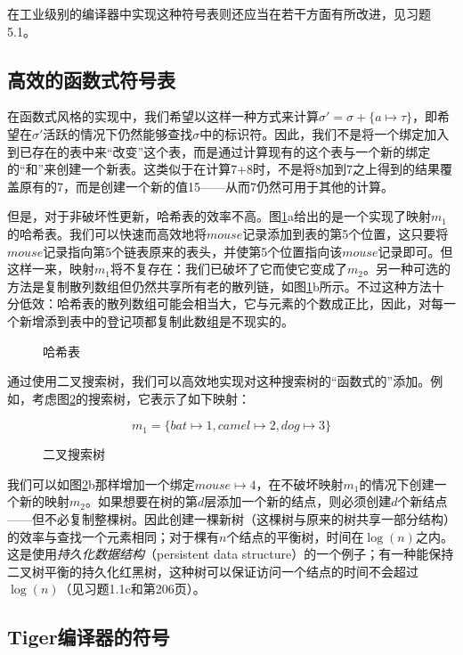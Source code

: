 \documentclass[cn,11pt,chinese]{elegantbook}
\begin{document}
在工业级别的编译器中实现这种符号表则还应当在若干方面有所改进，见习题5.1。

\subsection{高效的函数式符号表}

在函数式风格的实现中，我们希望以这样一种方式来计算$\sigma'=\sigma+\{a\mapsto\tau\}$，即希望在$\sigma'$活跃的情况下仍然能够查找$\sigma$中的标识符。因此，我们不是将一个绑定加入到已存在的表中来“改变”这个表，而是通过计算现有的这个表与一个新的绑定的“和”来创建一个新表。这类似于在计算7+8时，不是将8加到7之上得到的结果覆盖原有的7，而是创建一个新的值15——从而7仍然可用于其他的计算。

但是，对于非破坏性更新，哈希表的效率不高。图\ref{fig:5-3}a给出的是一个实现了映射$m_1$的哈希表。我们可以快速而高效地将$mouse$记录添加到表的第5个位置，这只要将$mouse$记录指向第5个链表原来的表头，并使第5个位置指向该$mouse$记录即可。但这样一来，映射$m_1$将不复存在：我们已破坏了它而使它变成了$m_2$。另一种可选的方法是复制散列数组但仍然共享所有老的散列链，如图\ref{fig:5-3}b所示。不过这种方法十分低效：哈希表的散列数组可能会相当大，它与元素的个数成正比，因此，对每一个新增添到表中的登记项都复制此数组是不现实的。

\begin{figure}[htbp]
  \centering
  
  \caption{哈希表}
  \label{fig:5-3}
\end{figure}

通过使用二叉搜索树，我们可以高效地实现对这种搜索树的“函数式的”添加。例如，考虑图\ref{fig:5-4}的搜索树，它表示了如下映射：

$$
m_1=\{bat\mapsto 1,camel\mapsto 2,dog\mapsto 3\}
$$

\begin{figure}[htbp]
  \centering
  
  \caption{二叉搜索树}
  \label{fig:5-4}
\end{figure}

我们可以如图\ref{fig:5-4}b那样增加一个绑定$mouse\mapsto 4$，在不破坏映射$m_1$的情况下创建一个新的映射$m_2$。如果想要在树的第$d$层添加一个新的结点，则必须创建$d$个新结点——但不必复制整棵树。因此创建一棵新树（这棵树与原来的树共享一部分结构）的效率与查找一个元素相同；对于棵有$n$个结点的平衡树，时间在$\log(n)$之内。这是使用\textit{持久化数据结构}（persistent data structure）的一个例子；有一种能保持二叉树平衡的持久化红黑树，这种树可以保证访问一个结点的时间不会超过$\log(n)$（见习题1.1c和第206页）。

\subsection{Tiger编译器的符号}
\end{document}
